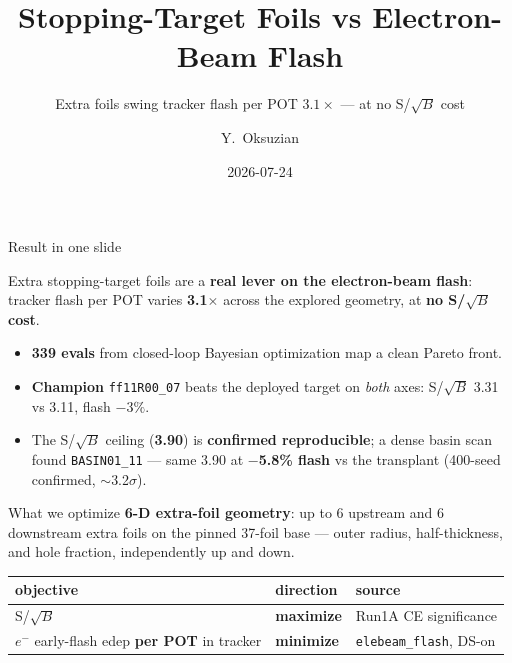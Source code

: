 \documentclass[aspectratio=169,10pt]{beamer}
\title[Foils vs Flash]{Stopping-Target Foils vs Electron-Beam Flash}
\subtitle{Extra foils swing tracker flash per POT $3.1\times$ --- at no S/$\sqrt{B}$ cost}
\author{Y.\ Oksuzian}
\institute[Mu2e autoresearch]{Mu2e --- autoresearch / closed-loop Bayesian optimization}
\date{2026-07-24}
\begin{document}
\begin{frame}
\titlepage
\end{frame}

\begin{frame}{Result in one slide}
\begin{block}{}
Extra stopping-target foils are a \textbf{real lever on the electron-beam flash}:
tracker flash per POT varies \textbf{3.1$\times$} across the explored geometry,
at \textbf{no S/$\sqrt{B}$ cost}.
\end{block}
\vspace{0.5em}
\begin{itemize}
  \item \textbf{339 evals} from closed-loop Bayesian optimization map a clean Pareto front.
  \item \textbf{Champion} \texttt{ff11R00\_07} beats the deployed target on \emph{both} axes:
        S/$\sqrt{B}$ 3.31 vs 3.11, flash $-3\%$.
  \item The S/$\sqrt{B}$ ceiling (\textbf{3.90}) is \textbf{confirmed reproducible}; a dense
        basin scan found \texttt{BASIN01\_11} --- same 3.90 at \textbf{$-$5.8\% flash} vs the
        transplant (400-seed confirmed, $\sim$3.2$\sigma$).
\end{itemize}
\end{frame}

\begin{frame}{What we optimize}
\textbf{6-D extra-foil geometry}: up to 6 upstream and 6 downstream extra foils on the
pinned 37-foil base --- outer radius, half-thickness, and hole fraction, independently
up and down.
\vspace{1.5em}
\begin{center}
\small
\begin{tabular}{@{}p{} l p{}@{}}
\toprule
objective & direction & source \\
\midrule
S/$\sqrt{B}$ & \textbf{maximize} & Run1A CE significance \\
$e^-$ early-flash edep \textbf{per POT} in tracker & \textbf{minimize} & \texttt{elebeam\_flash}, DS-on \\
\bottomrule
\end{tabular}
\end{center}
\end{frame}
\end{document}
